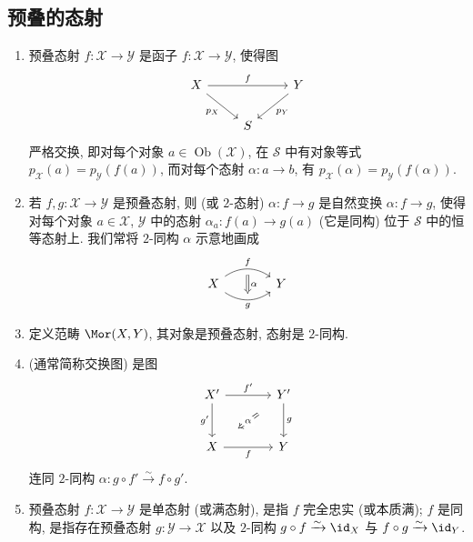 \subsection{预叠的态射}\label{src:3.4.4-subsection}
\begin{definition}\label{src:3.4.17}
\begin{enumerate}[(1)]
\item 预叠态射 $f:\mathcal X\to\mathcal Y$ 是函子 $f:\mathcal X\to\mathcal Y$, 使得图
\[
\begin{tikzcd}
\mathcal X\arrow[rr,"f"]\arrow[dr,"p_{\mathcal X}"']&&
\mathcal Y\arrow[dl,"p_{\mathcal Y}"]\\
&\mathcal S&
\end{tikzcd}
\]
严格交换, 即对每个对象 $a\in\operatorname{Ob}(\mathcal X)$, 在 $\mathcal S$ 中有对象等式 $p_{\mathcal X}(a)=p_{\mathcal Y}(f(a))$, 而对每个态射 $\alpha:a\to b$, 有 $p_{\mathcal X}(\alpha)=p_{\mathcal Y}(f(\alpha))$.
\item 若 $f,g:\mathcal X\to\mathcal Y$ 是预叠态射, 则  (或 $2$-态射) $\alpha:f\to g$ 是自然变换 $\alpha:f\to g$, 使得对每个对象 $a\in\mathcal X$, $\mathcal Y$ 中的态射 $\alpha_a:f(a)\to g(a)$ (它是同构) 位于 $\mathcal S$ 中的恒等态射上. 我们常将 $2$-同构 $\alpha$ 示意地画成
\[
\begin{tikzcd}[column sep=large]
\mathcal X\arrow[r,bend left=35,"f",""{name=F,below}]
\arrow[r,bend right=35,"g"'," "{name=G,above}]&
\mathcal Y
\arrow[Rightarrow,from=F,to=G,"\alpha"]
\end{tikzcd}
\]
\item 定义范畴 $\Mor(\mathcal X,\mathcal Y)$, 其对象是预叠态射, 态射是 $2$-同构.
\item {} (通常简称交换图) 是图
\[
\begin{tikzcd}[column sep=large,row sep=large]
\mathcal X'\arrow[r,"f'"]\arrow[d,"g'"']&
\mathcal Y'\arrow[d,"g"]\\
\mathcal X\arrow[r,"f"']&\mathcal Y
\arrow[Rightarrow,from=1-2,to=2-1,shorten <=1.4em,shorten >=1.4em,"\alpha" description]
\end{tikzcd}
\]
连同 $2$-同构 $\alpha:g\circ f'\xrightarrow{\sim}f\circ g'$.
\item 预叠态射 $f:\mathcal X\to\mathcal Y$ 是单态射 (或满态射), 是指 $f$ 完全忠实 (或本质满); $f$ 是同构, 是指存在预叠态射 $g:\mathcal Y\to\mathcal X$ 以及 $2$-同构 $g\circ f\xrightarrow{\sim}\id_{\mathcal X}$ 与 $f\circ g\xrightarrow{\sim}\id_{\mathcal Y}$.
\end{enumerate}
\end{definition}
